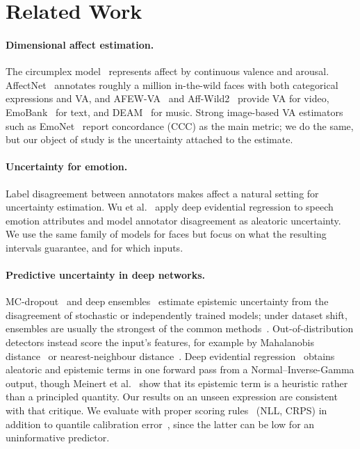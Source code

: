 \section{Related Work}

\paragraph{Dimensional affect estimation.} The circumplex
model~\cite{russell1980circumplex} represents affect by continuous valence and
arousal. AffectNet~\cite{mollahosseini2017affectnet} annotates roughly a million
in-the-wild faces with both categorical expressions and VA, and
AFEW-VA~\cite{kossaifi2017afew,dhall2012afew} and Aff-Wild2~\cite{kollias2019affwild2} provide
VA for video, EmoBank~\cite{buechel2017emobank} for text, and DEAM~\cite{aljanaki2017deam}
for music. Strong image-based VA estimators such as
EmoNet~\cite{toisoul2021estimation} report concordance (CCC) as the main metric;
we do the same, but our object of study is the uncertainty attached to the
estimate.

\paragraph{Uncertainty for emotion.} Label disagreement between annotators makes
affect a natural setting for uncertainty estimation. Wu et
al.~\cite{wu2023deer} apply deep evidential regression to speech emotion
attributes and model annotator disagreement as aleatoric uncertainty. We use the
same family of models for faces but focus on what the resulting intervals
guarantee, and for which inputs.

\paragraph{Predictive uncertainty in deep networks.} MC-dropout~\cite{gal2016dropout}
and deep ensembles~\cite{lakshminarayanan2017simple} estimate epistemic
uncertainty from the disagreement of stochastic or independently trained models;
under dataset shift, ensembles are usually the strongest of the common
methods~\cite{ovadia2019trust}. Out-of-distribution detectors instead score the
input's features, for example by Mahalanobis distance~\cite{lee2018simple} or
nearest-neighbour distance~\cite{sun2022knn}. Deep evidential
regression~\cite{amini2020evidential} obtains aleatoric and epistemic terms in
one forward pass from a Normal--Inverse-Gamma output, though Meinert et
al.~\cite{meinert2023unreasonable} show that its epistemic term is a heuristic
rather than a principled quantity. Our results on an unseen expression are
consistent with that critique. We evaluate with proper scoring
rules~\cite{gneiting2007strictly} (NLL, CRPS) in addition to quantile
calibration error~\cite{kuleshov2018calibrated}, since the latter can be low for
an uninformative predictor.

